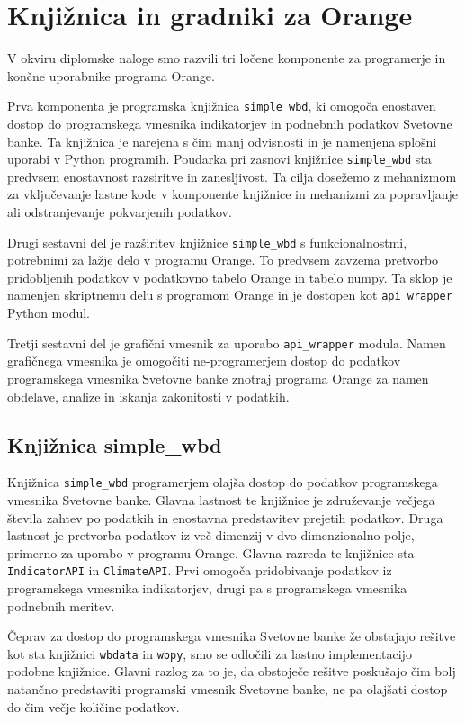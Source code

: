 
\chapter{Knjižnica in gradniki za Orange}

V okviru diplomske naloge smo razvili tri ločene komponente za programerje in
končne uporabnike programa Orange. 

Prva komponenta je programska knjižnica \verb|simple_wbd|, ki
omogoča enostaven dostop do programskega vmesnika indikatorjev in podnebnih
podatkov Svetovne banke. Ta knjižnica je narejena s čim manj odvisnosti in je 
namenjena splošni uporabi v Python programih. Poudarka pri zasnovi knjižnice 
\verb|simple_wbd| sta predvsem enostavnost razsiritve in zanesljivost. Ta cilja
dosežemo z mehanizmom za vključevanje lastne kode v komponente knjižnice
in mehanizmi za popravljanje ali odstranjevanje pokvarjenih podatkov.

Drugi sestavni del je razširitev knjižnice \verb|simple_wbd| s 
funkcionalnostmi, potrebnimi za lažje delo v programu Orange. To predvsem 
zavzema pretvorbo pridobljenih podatkov v podatkovno tabelo Orange in tabelo 
numpy. Ta sklop je namenjen skriptnemu delu s programom Orange 
\cite{orange_scripting} in je dostopen
kot \verb|api_wrapper| Python modul. 

Tretji sestavni del je grafični vmesnik za uporabo \verb|api_wrapper| modula.
Namen grafičnega vmesnika je omogočiti ne-programerjem dostop do podatkov 
programskega vmesnika Svetovne banke znotraj programa Orange za namen obdelave,
analize in iskanja zakonitosti v podatkih.

\section{Knjižnica simple\_wbd}

Knjižnica \verb|simple_wbd| programerjem olajša dostop do podatkov 
programskega vmesnika Svetovne banke. Glavna lastnost te knjižnice je 
združevanje večjega števila zahtev po podatkih in enostavna predstavitev 
prejetih podatkov. Druga lastnost je pretvorba podatkov iz več dimenzij v 
dvo-dimenzionalno polje, primerno za uporabo v programu Orange. Glavna 
razreda te knjižnice sta \verb|IndicatorAPI| in \verb|ClimateAPI|. Prvi 
omogoča pridobivanje podatkov iz programskega vmesnika indikatorjev, drugi pa 
s programskega vmesnika podnebnih meritev.


Čeprav za dostop do programskega vmesnika Svetovne banke že obstajajo 
rešitve kot sta knjižnici 
\verb|wbdata| in
\verb|wbpy|, smo se odločili
za lastno implementacijo podobne knjižnice. Glavni razlog za to je, da
obstoječe rešitve poskušajo čim bolj natančno predstaviti programski
vmesnik Svetovne banke, ne pa olajšati dostop do čim večje količine
podatkov.

